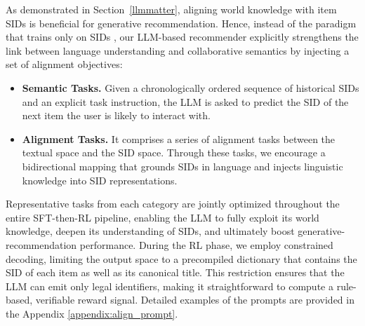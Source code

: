 As demonstrated in Section~\ref{llmmatter}, aligning world knowledge with item SIDs is beneficial for generative recommendation.  
Hence, instead of the paradigm that trains only on SIDs \citep{TIGER, OneRec, mtgr}, our LLM-based recommender explicitly strengthens the link between language understanding and collaborative semantics by injecting a set of alignment objectives:
\begin{itemize}[leftmargin=*]
    \item \textbf{Semantic Tasks.} 
    Given a chronologically ordered sequence of historical SIDs and an explicit task instruction, the LLM is asked to predict the SID of the next item the user is likely to interact with. 
    \item \textbf{Alignment Tasks.} %
It comprises a series of alignment tasks between the textual space and the SID space. Through these tasks, we encourage a bidirectional mapping that grounds SIDs in language and injects linguistic knowledge into SID representations.
\end{itemize}
Representative tasks from each category are jointly optimized throughout the entire SFT-then-RL pipeline, enabling the LLM to fully exploit its world knowledge, deepen its understanding of SIDs, and ultimately boost generative-recommendation performance. During the RL phase, we employ constrained decoding, limiting the output space to a precompiled dictionary that contains the SID of each item as well as its canonical title. This restriction ensures that the LLM can emit only legal identifiers, making it straightforward to compute a rule-based, verifiable reward signal. Detailed examples of the prompts are provided in the Appendix \ref{appendix:align_prompt}.

